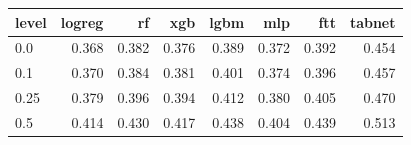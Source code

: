 \begin{tabular}{lrrrrrrr}
\toprule
level & logreg & rf & xgb & lgbm & mlp & ftt & tabnet \\
\midrule
0.0 & 0.368 & 0.382 & 0.376 & 0.389 & 0.372 & 0.392 & 0.454 \\
0.1 & 0.370 & 0.384 & 0.381 & 0.401 & 0.374 & 0.396 & 0.457 \\
0.25 & 0.379 & 0.396 & 0.394 & 0.412 & 0.380 & 0.405 & 0.470 \\
0.5 & 0.414 & 0.430 & 0.417 & 0.438 & 0.404 & 0.439 & 0.513 \\
\bottomrule
\end{tabular}

